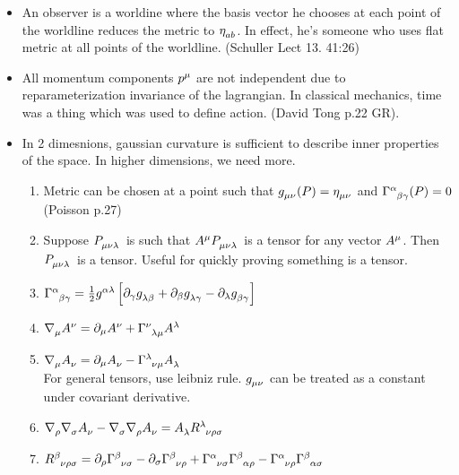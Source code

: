 \documentclass{report}
\begin{document}
\begin{itemize}
  \item An observer is a worldine where the basis vector he chooses at each point of the worldline reduces the metric to $\eta\indices{_a_b}$. In effect, he's someone who uses flat metric at all points of the worldline. (Schuller Lect 13. 41:26)

  \item All momentum components $p\indices{^\mu}$ are not independent due to reparameterization invariance of the lagrangian. In classical mechanics, time was a thing which was used to define action. (David Tong p.22 GR).


  \item In 2 dimesnions, gaussian curvature is sufficient to describe inner properties of the space. In higher dimensions, we need more.


    \begin{enumerate}
      \item Metric can be chosen at a point such that $g\indices{_\mu_\nu}(P) = \eta\indices{_\mu_\nu}$ and $\Gamma\indices{^\alpha_\beta_\gamma}(P) = 0$ (Poisson p.27)

      \item Suppose $P\indices{_\mu_\nu_\lambda}$ is such that $A\indices{^\mu}P\indices{_\mu_\nu_\lambda}$ is a tensor for any vector $A\indices{^\mu}$. Then $P\indices{_\mu_\nu_\lambda}$ is a tensor. Useful for quickly proving something is a tensor.
      
      \item $\Gamma\indices{^\alpha_ \beta_ \gamma} = \frac{1}{2}g\indices{^\alpha^\lambda}\left[\partial_ \gamma g\indices{_ \lambda_ \beta} + \partial_ \beta g\indices{_\lambda_ \gamma}-\partial_\lambda g\indices{_ \beta_ \gamma}\right]$
      \item
        $\nabla\indices{_\mu}A\indices{^\nu} = \partial_{\mu}A\indices{^\nu} + \Gamma\indices{^\nu_\lambda_\mu}A\indices{^\lambda}$
      \item
        $\nabla\indices{_\mu}A\indices{_\nu} = \partial_{\mu}A\indices{_\nu} - \Gamma\indices{^\lambda_\nu_\mu}A\indices{_\lambda}$ \\
        For general tensors, use leibniz rule. $g\indices{_\mu_\nu}$ can be treated as a constant under covariant derivative.

      \item $\nabla\indices{_ \rho}\nabla\indices{_\sigma}A\indices{_\nu} - \nabla\indices{_\sigma}\nabla\indices{_ \rho}A\indices{_ \nu} = A\indices{_ \lambda}R\indices{^\lambda_\nu_ \rho_\sigma}$

      \item $R\indices{^\beta_\nu_ \rho_\sigma} = \partial_ {\rho}\Gamma\indices{^\beta_\nu_\sigma}-\partial_ {\sigma}\Gamma\indices{^\beta_\nu_\rho} + \Gamma\indices{^\alpha_\nu_\sigma} \Gamma\indices{^\beta_ \alpha_ \rho} - \Gamma\indices{^\alpha_\nu_ \rho} \Gamma\indices{^\beta_ \alpha_ \sigma}$

    \end{enumerate}
\end{itemize}
\end{document}
